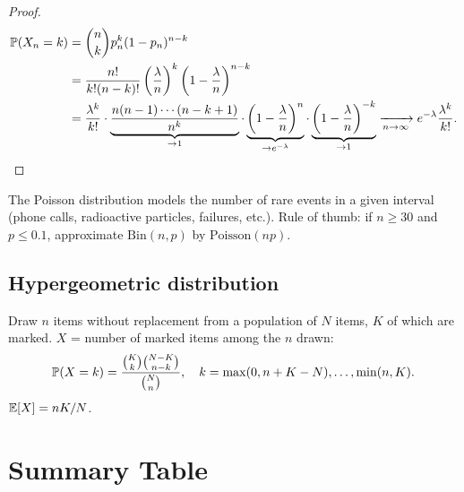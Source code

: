\begin{proof}
\begin{align*}
    \mathbb{P}(X_n = k) &= \binom{n}{k} p_n^k (1-p_n)^{n-k} \\
    &= \frac{n!}{k!(n-k)!}\left(\frac{\lambda}{n}\right)^k
       \left(1 - \frac{\lambda}{n}\right)^{n-k} \\
    &= \frac{\lambda^k}{k!}\cdot
       \underbrace{\frac{n(n-1)\cdots(n-k+1)}{n^k}}_{\to 1}\cdot
       \underbrace{\left(1 - \frac{\lambda}{n}\right)^n}_{\to e^{-\lambda}}\cdot
       \underbrace{\left(1 - \frac{\lambda}{n}\right)^{-k}}_{\to 1}
    \xrightarrow[n\to\infty]{} e^{-\lambda}\frac{\lambda^k}{k!}. \qedhere
\end{align*}
\end{proof}

\begin{intuition}[title=\textbf{When to use Poisson?}]
The Poisson distribution models the number of rare events in a given interval
(phone calls, radioactive particles, failures, etc.). Rule of thumb: if $n \geq 30$
and $p \leq 0.1$, approximate $\mathrm{Bin}(n,p)$ by $\mathrm{Poisson}(np)$.
\end{intuition}

\subsection{Hypergeometric distribution}

\begin{definition}[Hypergeometric]
Draw $n$ items without replacement from a population of $N$ items, $K$ of which
are marked. $X$ = number of marked items among the $n$ drawn:
\[
    \mathbb{P}(X = k) = \frac{\binom{K}{k}\binom{N-K}{n-k}}{\binom{N}{n}},
    \quad k = \max(0, n+K-N), \ldots, \min(n, K).
\]
$\mathbb{E}[X] = nK/N$.
\end{definition}

\section{Summary Table}

